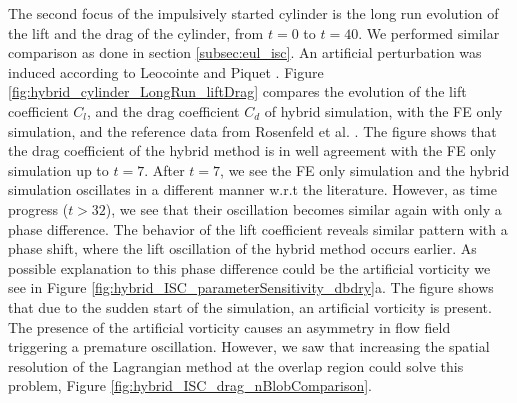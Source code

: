 %




The second focus of the impulsively started cylinder is the long run evolution of the lift and the drag of the cylinder, from $t=0$ to $t=40$. We performed similar comparison as done in section \ref{subsec:eul_isc}. An artificial perturbation was induced according to Leocointe and Piquet \cite{Lecointe1984}. Figure \ref{fig:hybrid_cylinder_LongRun_liftDrag} compares the evolution of the lift coefficient $C_l$, and the drag coefficient $C_d$ of hybrid simulation, with the FE only simulation, and the reference data from Rosenfeld et al. \cite{MosheRosenFeldDochanKwak1991}. The figure shows that the drag coefficient of the hybrid method is in well agreement with the FE only simulation up to $t=7$. After $t=7$, we see the FE only simulation and the hybrid simulation oscillates in a different manner w.r.t the literature. However, as time progress ($t>32$), we see that their oscillation becomes similar again with only a phase difference. The behavior of the lift coefficient reveals similar pattern with a phase shift, where the lift oscillation of the hybrid method occurs earlier. As possible explanation to this phase difference could be the artificial vorticity we see in Figure \ref{fig:hybrid_ISC_parameterSensitivity_dbdry}a. The figure shows that due to the sudden start of the simulation, an artificial vorticity is present. The presence of the artificial vorticity causes an asymmetry in flow field triggering a premature oscillation. However, we saw that increasing the spatial resolution of the Lagrangian method at the overlap region could solve this problem, Figure \ref{fig:hybrid_ISC_drag_nBlobComparison}.





	


